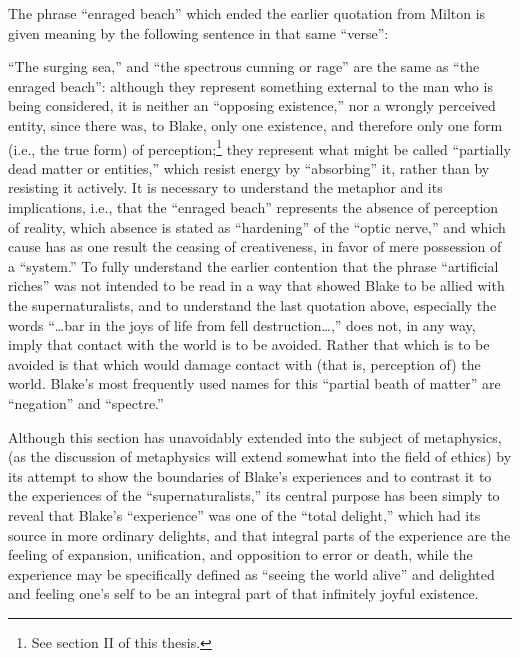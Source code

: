 
The phrase \enquote{enraged beach} which ended the earlier quotation from Milton
is given meaning by the following sentence in that same \enquote{verse}:


\enquote{The surging sea,} and \enquote{the spectrous cunning or rage} are the same as \enquote{the enraged beach}:
although they represent something external to the man who is being considered, it is neither an
\enquote{opposing existence,} nor a wrongly perceived entity, since there was, to Blake, only
one existence, and therefore only one form (i.e., the true form) of perception;\footnote{See section II of this thesis.}
they represent what might be called \enquote{partially dead matter or entities,} which resist energy
by \enquote{absorbing} it, rather than by resisting it actively. It is necessary to understand
the metaphor and its implications, i.e., that the \enquote{enraged beach} represents the absence of
perception of reality, which absence is stated as \enquote{hardening} of the \enquote{optic nerve,} and
which cause has as one result the ceasing of creativeness, in favor of mere possession of a \enquote{system.}
To fully understand the earlier contention that the phrase \enquote{artificial riches} was not intended
to be read in a way that showed Blake to be allied with the supernaturalists, and to understand
the last quotation above, especially the words \enquote{\dots bar in the joys of life from fell destruction\dots,}
does not, in any way, imply that contact with the world is to be avoided. Rather that which is to be
avoided is that which would damage contact with (that is, perception of) the world.
Blake's most frequently used names for this \enquote{partial beath of matter} are \enquote{negation} and \enquote{spectre.}

Although this section has unavoidably extended into the subject of metaphysics, (as the discussion of metaphysics
will extend somewhat into the field of ethics) by its attempt to show the boundaries
of Blake's experiences and to contrast it to the experiences of the \enquote{supernaturalists,} its central
purpose has been simply to reveal that Blake's \enquote{experience} was one of the \enquote{total delight,}
which had its source in more ordinary delights, and that integral parts of the experience are
the feeling of expansion, unification, and opposition to error or death, while the experience may be
specifically defined as \enquote{seeing the world alive} and delighted and feeling one's self to be an integral part
of that infinitely joyful existence.

